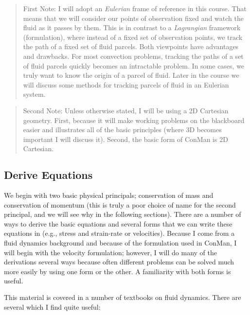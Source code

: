 \documentclass[12pt,twoside]{article}
\begin{document}
\begin{quotation} 
\noindent
First Note:  I will adopt an {\em Eulerian} frame of reference
in this course.  That means that we will consider our points of observation
fixed and watch the fluid as it passes by them.   This is in contrast to a {\em
Lagrangian} framework (formulation), where instead of a fixed set of observation
points, we track the path of a fixed set of fluid parcels.  Both viewpoints have
advantages and drawbacks.   For most convection problems, tracking the paths of
a set of fluid parcels quickly becomes an intractable problem.  In some cases,
we truly want to know the origin of a parcel of fluid.   Later in the course we
will discuss some methods for tracking parcels of fluid in an Eulerian system.
\end{quotation}
 
\begin{quotation} 
\noindent
Second Note:  Unless otherwise stated, I will be using a 2D
Cartesian geometry.  First, because it will make working problems on the
blackboard easier and illustrates all of the basic principles (where 3D becomes
important  I will discuss it).  Second, the basic form of ConMan is 2D Cartesian.
\end{quotation}

\subsection{Derive Equations}

We begin with two basic physical principals; conservation of mass and
conservation of momentum (this is truly a poor choice of name for the second
principal, and we will see why in the following sections).  There are a number
of ways to derive the basic equations and several forms that we can write these
equations in (e.g., stress and strain-rate or velocities).  Because I come from
a fluid dynamics background and because of the formulation used in ConMan, I
will begin with the velocity formulation; however, I will do many of the
derivations several ways because often different problems can be solved much
more easily by using one form or the other.   A familiarity with both forms is
useful.  

This material is covered in a number of textbooks on fluid dynamics.  There are
several which I find quite useful:
\end{document}
